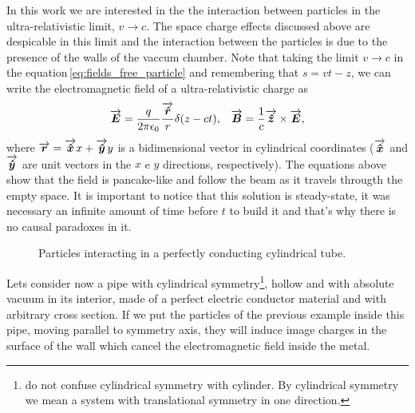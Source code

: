In this work we are interested in the the interaction between particles in the ultra-relativistic limit, $v \to c$. The space charge effects discussed above are despicable in this limit and the interaction between the particles is due to the presence of the walls of the vaccum chamber. Note that taking the limit $v \to c$ in the equation\,\ref{eq:fields_free_particle} and remembering that $s = vt - z$, we can write the electromagnetic field of a ultra-relativistic charge as
\begin{align}
\overrightarrow{\boldsymbol{E}} = \frac{q}{2\pi\epsilon_0}\frac{\overrightarrow{\boldsymbol{\hat{r}}}}{r}\delta(z-ct), & & \overrightarrow{\boldsymbol{B}} =\frac{1}{c}\overrightarrow{\boldsymbol{\hat{z}}}\times\overrightarrow{\boldsymbol{E}},
\end{align}
where $\overrightarrow{\boldsymbol{r}} = \overrightarrow{\boldsymbol{\hat{x}}}x + \overrightarrow{\boldsymbol{\hat{y}}}y$ is a bidimensional vector in cylindrical coordinates ($\overrightarrow{\boldsymbol{\hat{x}}}$ and $\overrightarrow{\boldsymbol{\hat{y}}}$ are unit vectors in the $x$ e $y$ directions, respectively). The equations above show that the field is pancake-like and follow the beam as it travels througth the empty space. It is important to notice that this solution is steady-state, it was necessary an infinite amount of time before $t$ to build it and that's why there is no causal paradoxes in it.

\begin{figure}[hb!]
\centering
\label{fig:wake2}
\caption{Particles interacting in a perfectly conducting cylindrical tube.}
\end{figure}

Lets consider now a pipe with cylindrical symmetry\footnote{do not confuse cylindrical symmetry with cylinder. By cylindrical symmetry we mean a system with translational symmetry in one direction.}, hollow and with absolute vacuum in its interior, made of a perfect electric conductor material and with arbitrary cross section. If we put the particles of the previous example inside this pipe, moving parallel to symmetry axis, they will induce image charges in the surface of the wall which cancel the electromagnetic field inside the metal.

